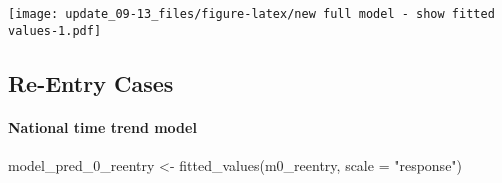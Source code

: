 \documentclass[
]{article}
\newenvironment{Shaded}{\begin{snugshade}}{\end{snugshade}}
\newcommand{\AttributeTok}[1]{\textcolor[rgb]{0.77,0.63,0.00}{#1}}
\newcommand{\FunctionTok}[1]{\textcolor[rgb]{0.00,0.00,0.00}{#1}}
\newcommand{\NormalTok}[1]{#1}
\newcommand{\OtherTok}[1]{\textcolor[rgb]{0.56,0.35,0.01}{#1}}
\newcommand{\StringTok}[1]{\textcolor[rgb]{0.31,0.60,0.02}{#1}}
\begin{document}
\texttt{[image: update\_09-13\_files/figure-latex/new full model - show fitted values-1.pdf]}

\newpage

\hypertarget{re-entry-cases}{%
\subsection{Re-Entry Cases}\label{re-entry-cases}}

\hypertarget{national-time-trend-model-1}{%
\paragraph{National time trend
model}\label{national-time-trend-model-1}}

\begin{Shaded}
\begin{Highlighting}[]
\NormalTok{model\_pred\_0\_reentry }\OtherTok{\textless{}{-}} \FunctionTok{fitted\_values}\NormalTok{(m0\_reentry, }\AttributeTok{scale =} \StringTok{"response"}\NormalTok{)}



\end{Highlighting}
\end{Shaded}
\end{document}
